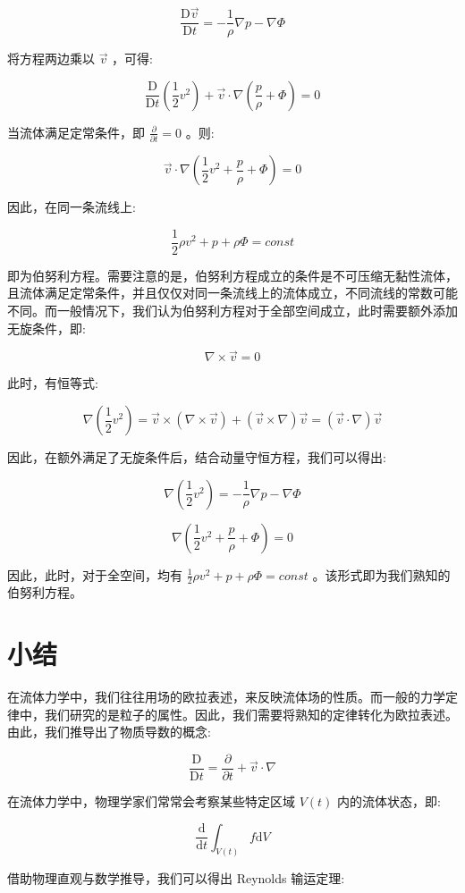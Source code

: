 \documentclass[fontset=windows]{article}
\begin{document}
$$
\frac{\mathrm{D} \vec{v}}{\mathrm{D} t} = -\frac{1}{\rho}\nabla{p} - \nabla \Phi
$$

将方程两边乘以 $\vec{v}$ ，可得:

$$
\frac{\mathrm{D}}{\mathrm{D}t}(\frac{1}{2}v^2) + \vec{v} \cdot \nabla(\frac{p}{\rho} + \Phi) = 0
$$

当流体满足定常条件，即 $\frac{\partial}{\partial t} = 0$ 。则:

$$
\vec{v} \cdot \nabla(\frac{1}{2} v^2 + \frac{p}{\rho} + \Phi) = 0
$$

因此，在同一条流线上:

$$
\frac{1}{2} \rho v^2 + p + \rho\Phi = const
$$

即为伯努利方程。需要注意的是，伯努利方程成立的条件是不可压缩无黏性流体，且流体满足定常条件，并且仅仅对同一条流线上的流体成立，不同流线的常数可能不同。而一般情况下，我们认为伯努利方程对于全部空间成立，此时需要额外添加无旋条件，即:

$$
\nabla \times \vec{v} = 0
$$

此时，有恒等式:

$$
\nabla(\frac{1}{2} v^2)= \vec{v} \times (\nabla \times \vec{v}) + (\vec{v} \times \nabla) \vec{v} = (\vec{v} \cdot \nabla) \vec{v}
$$

因此，在额外满足了无旋条件后，结合动量守恒方程，我们可以得出: 

$$
\nabla(\frac{1}{2} v^2) = -\frac{1}{\rho}\nabla{p} - \nabla \Phi
$$

$$
\nabla(\frac{1}{2} v^2 + \frac{p}{\rho} + \Phi) = 0
$$

因此，此时，对于全空间，均有 $\frac{1}{2} \rho v^2 + p + \rho\Phi = const$ 。该形式即为我们熟知的伯努利方程。

\section{小结}

在流体力学中，我们往往用场的欧拉表述，来反映流体场的性质。而一般的力学定律中，我们研究的是粒子的属性。因此，我们需要将熟知的定律转化为欧拉表述。由此，我们推导出了物质导数的概念:

$$
\frac{\mathrm{D}}{\mathrm{D}t} = \frac{\partial}{\partial t} + \vec{v} \cdot \nabla
$$

在流体力学中，物理学家们常常会考察某些特定区域 $ V(t) $ 内的流体状态，即:

$$
\frac{\mathrm{d}}{\mathrm{d}t} \int_{V(t)} f \mathrm{d}V
$$

借助物理直观与数学推导，我们可以得出 Reynolds 输运定理:
\end{document}
